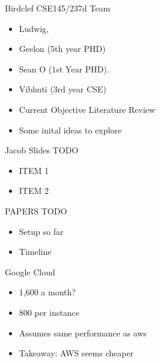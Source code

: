 \begin{frame}{Birdclef CSE145/237d Team}
    \begin{itemize}
        \item Ludwig,
        \item Geelon (5th year PHD)
        \item Sean O (1st Year PHD).
        \item Vibhuti (3rd year CSE)
        \item Current Objective Literature Review
        \item Some inital ideas to explore
    \end{itemize}
\end{frame}

\begin{frame}{Jacob Slides TODO}
    \begin{itemize}
        \item ITEM 1
        \item ITEM 2
    \end{itemize}
\end{frame}

\begin{frame}{PAPERS TODO}
    \begin{itemize}
        \item Setup so far
        \item Timeline
    \end{itemize}
\end{frame}

\begin{frame}{Google Cloud}
    \begin{itemize}
        \item 1,600 a month?
        \item 800 per instance
        \item Assumes same performance as aws
        \item Takeaway: AWS seems cheaper
    \end{itemize}
\end{frame}




